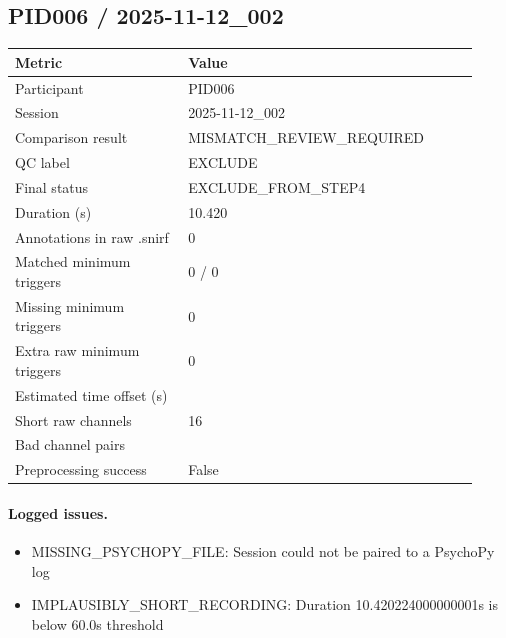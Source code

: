 \subsection*{PID006 / 2025-11-12\_002}
\begin{tabular}{p{0.34\linewidth}p{0.58\linewidth}}
\toprule
Metric & Value\\
\midrule
Participant & PID006\\
Session & 2025-11-12\_002\\
Comparison result & MISMATCH\_REVIEW\_REQUIRED\\
QC label & EXCLUDE\\
Final status & EXCLUDE\_FROM\_STEP4\\
Duration (s) & 10.420\\
Annotations in raw .snirf & 0\\
Matched minimum triggers & 0 / 0\\
Missing minimum triggers & 0\\
Extra raw minimum triggers & 0\\
Estimated time offset (s) & \\
Short raw channels & 16\\
Bad channel pairs & \\
Preprocessing success & False\\
\bottomrule
\end{tabular}
\paragraph{Logged issues.}
\begin{itemize}
\item [ERROR] MISSING\_PSYCHOPY\_FILE: Session could not be paired to a PsychoPy log
\item [ERROR] IMPLAUSIBLY\_SHORT\_RECORDING: Duration 10.420224000000001s is below 60.0s threshold
\end{itemize}
